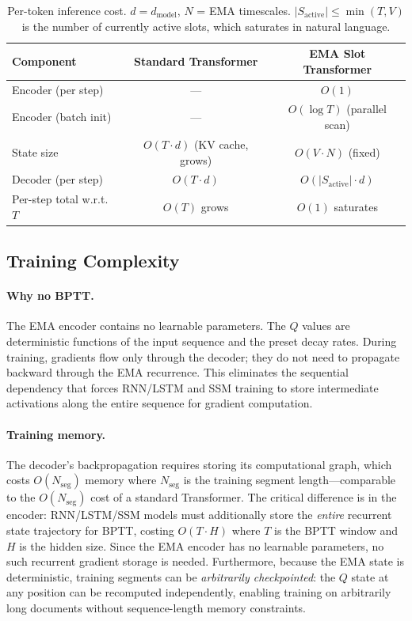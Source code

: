 \documentclass[11pt]{article}
\begin{document}
\begin{table}[ht]
\centering
\small
\begin{tabular}{l c c}
\toprule
Component & Standard Transformer & EMA Slot Transformer \\
\midrule
Encoder (per step) & --- & $O(1)$ \\
Encoder (batch init) & --- & $O(\log T)$ (parallel scan) \\
State size & $O(T \cdot d)$ (KV cache, grows) & $O(V \cdot N)$ (fixed) \\
Decoder (per step) & $O(T \cdot d)$ & $O(|S_{\text{active}}| \cdot d)$ \\
\midrule
Per-step total w.r.t.\ $T$ & $O(T)$ grows & $O(1)$ saturates \\
\bottomrule
\end{tabular}
\caption{Per-token inference cost. $d = d_{\text{model}}$, $N$ = EMA timescales. $|S_{\text{active}}| \le \min(T, V)$ is the number of currently active slots, which saturates in natural language.}
\label{tab:pertok}
\end{table}

\subsection{Training Complexity}

\paragraph{Why no BPTT.}
The EMA encoder contains no learnable parameters. The $Q$ values are deterministic functions of the input sequence and the preset decay rates. During training, gradients flow only through the decoder; they do not need to propagate backward through the EMA recurrence. This eliminates the sequential dependency that forces RNN/LSTM and SSM training to store intermediate activations along the entire sequence for gradient computation.

\paragraph{Training memory.}
The decoder's backpropagation requires storing its computational graph, which costs $O(N_{\text{seg}})$ memory where $N_{\text{seg}}$ is the training segment length---comparable to the $O(N_{\text{seg}})$ cost of a standard Transformer. The critical difference is in the encoder: RNN/LSTM/SSM models must additionally store the \emph{entire} recurrent state trajectory for BPTT, costing $O(T \cdot H)$ where $T$ is the BPTT window and $H$ is the hidden size. Since the EMA encoder has no learnable parameters, no such recurrent gradient storage is needed. Furthermore, because the EMA state is deterministic, training segments can be \emph{arbitrarily checkpointed}: the $Q$ state at any position can be recomputed independently, enabling training on arbitrarily long documents without sequence-length memory constraints.
\end{document}
